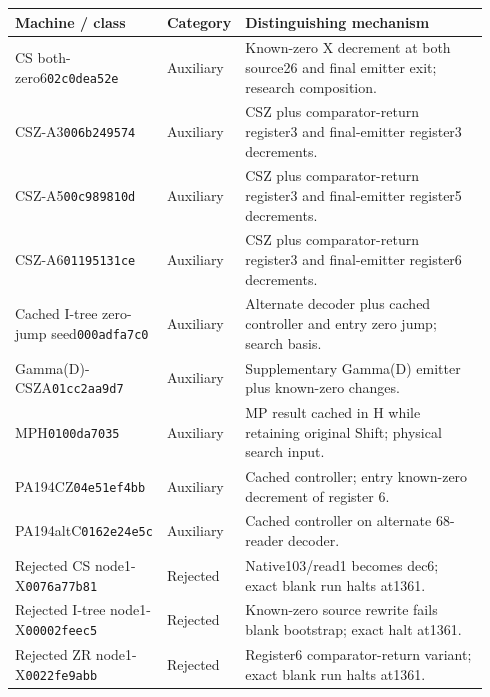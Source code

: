 \small
\begin{longtable}{@{}p{0.245\linewidth}p{0.14\linewidth}p{0.55\linewidth}@{}}
\toprule Machine / class & Category & Distinguishing mechanism \\
\midrule\endhead
CS both-zero6\newline\texttt{02c0dea52e} & Auxiliary & Known-zero X decrement at both source26 and final emitter exit; research composition. \\[2pt]
CSZ-A3\newline\texttt{006b249574} & Auxiliary & CSZ plus comparator-return register3 and final-emitter register3 decrements. \\[2pt]
CSZ-A5\newline\texttt{00c989810d} & Auxiliary & CSZ plus comparator-return register3 and final-emitter register5 decrements. \\[2pt]
CSZ-A6\newline\texttt{01195131ce} & Auxiliary & CSZ plus comparator-return register3 and final-emitter register6 decrements. \\[2pt]
Cached I-tree zero-jump seed\newline\texttt{000adfa7c0} & Auxiliary & Alternate decoder plus cached controller and entry zero jump; search basis. \\[2pt]
Gamma(D)-CSZA\newline\texttt{01cc2aa9d7} & Auxiliary & Supplementary Gamma(D) emitter plus known-zero changes. \\[2pt]
MPH\newline\texttt{0100da7035} & Auxiliary & MP result cached in H while retaining original Shift; physical search input. \\[2pt]
PA194CZ\newline\texttt{04e51ef4bb} & Auxiliary & Cached controller; entry known-zero decrement of register 6. \\[2pt]
PA194altC\newline\texttt{0162e24e5c} & Auxiliary & Cached controller on alternate 68-reader decoder. \\[2pt]
Rejected CS node1-X\newline\texttt{0076a77b81} & Rejected & Native103/read1 becomes dec6; exact blank run halts at1361. \\[2pt]
Rejected I-tree node1-X\newline\texttt{00002feec5} & Rejected & Known-zero source rewrite fails blank bootstrap; exact halt at1361. \\[2pt]
Rejected ZR node1-X\newline\texttt{0022fe9abb} & Rejected & Register6 comparator-return variant; exact blank run halts at1361. \\[2pt]

\end{longtable}
